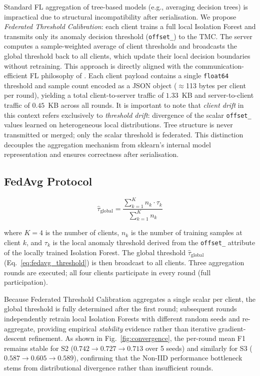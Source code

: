 \documentclass[conference]{IEEEtran}
\begin{document}
Standard FL aggregation of tree-based models (e.g., averaging decision
trees) is impractical due to structural incompatibility after
serialisation.
We propose \textit{Federated Threshold Calibration}: each client trains
a full local Isolation Forest and transmits only its anomaly decision
threshold (\texttt{offset\_}) to the TMC\@.
The server computes a sample-weighted average of client thresholds and
broadcasts the global threshold back to all clients, which update their
local decision boundaries without retraining.
This approach is directly aligned with the communication-efficient FL
philosophy of \cite{liu2021deep}.
Each client payload contains a single \texttt{float64} threshold and
sample count encoded as a JSON object ($\approx$113 bytes per client
per round), yielding a total client-to-server traffic of $1.33$~KB and
server-to-client traffic of $0.45$~KB across all rounds.
It is important to note that \textit{client drift} in this context
refers exclusively to \emph{threshold drift}: divergence of the
scalar \texttt{offset\_} values learned on heterogeneous local
distributions.
Tree structure is never transmitted or merged; only the scalar
threshold is federated.
This distinction decouples the aggregation mechanism from
sklearn's internal model representation and ensures correctness
after serialisation.

\subsection{FedAvg Protocol}

\begin{equation}
\hat{\tau}_{\text{global}} =
  \frac{\sum_{k=1}^{K} n_k \cdot \tau_k}{\sum_{k=1}^{K} n_k}
\label{eq:fedavg_threshold}
\end{equation}

\noindent
where $K=4$ is the number of clients, $n_k$ is the number of training
samples at client $k$, and $\tau_k$ is the local anomaly threshold
derived from the \texttt{offset\_} attribute of the locally trained
Isolation Forest.
The global threshold $\hat{\tau}_{\text{global}}$
(Eq.~\ref{eq:fedavg_threshold}) is then broadcast to all clients.
Three aggregation rounds are executed; all four clients participate in
every round (full participation).

Because Federated Threshold Calibration aggregates a single scalar per
client, the global threshold is fully determined after the first round;
subsequent rounds independently retrain local Isolation Forests with
different random seeds and re-aggregate, providing empirical
\emph{stability} evidence rather than iterative gradient-descent
refinement.
As shown in Fig.~\ref{fig:convergence}, the per-round mean F1 remains
stable for S2 ($0.742 \to 0.727 \to 0.713$ over 5 seeds) and similarly
for S3 ($0.587 \to 0.605 \to 0.589$), confirming that the Non-IID
performance bottleneck stems from distributional divergence rather than
insufficient rounds.
\end{document}
